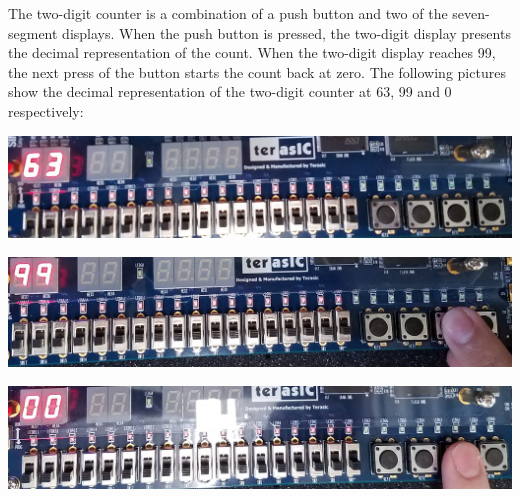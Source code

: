 \documentclass{article}
\newenvironment{Figure}
  {\par\medskip\noindent\ignorespaces\minipage{\linewidth}}
  {\endminipage\par\medskip}
\begin{document}
\begin{multicols*}{2}
The two-digit counter is a combination of a push button and two of the seven-segment displays. When the push button is pressed, the two-digit display presents the decimal representation of the count. When the two-digit display reaches 99, the next press of the button starts the count back at zero. The following pictures show the decimal representation of the two-digit counter at 63, 99 and 0 respectively:

\begin{Figure}
 \centering
 \includegraphics[width=\linewidth]{Digital63.jpg}
\end{Figure}

\begin{Figure}
 \centering
 \includegraphics[width=\linewidth]{Digital99.jpg}
\end{Figure}

\begin{Figure}
 \centering
 \includegraphics[width=\linewidth]{Digital00.jpg}
\end{Figure}


\vspace{15 pt}




\end{multicols*}
\end{document}
